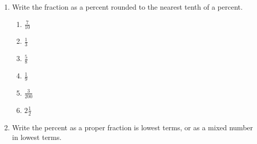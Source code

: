 \documentclass[12pt]{article}
\begin{document}
\begin{enumerate}
\begin{multicols}{2}
\begin{enumerate}
\item \hspace{0.5in} $252\%$
  \vspace{0.25in}

\item \hspace{0.5in} $91.5\%$
  \vspace{0.25in}

\item \hspace{0.5in} $99\frac{9}{10}\%$
  \vspace{0.25in}
\end{enumerate}
\end{multicols}

\item Write the fraction as a percent rounded to the nearest tenth of a percent.
\begin{multicols}{2}
\begin{enumerate}

\item \hspace{0.5in} $\frac{7}{10}$
  \vspace{0.25in}

\item \hspace{0.5in} $\frac{1}{3}$
  \vspace{0.25in}

\item \hspace{0.5in} $\frac{5}{8}$
  \vspace{0.25in}

\item \hspace{0.5in} $\frac{1}{9}$
  \vspace{0.25in}

\item \hspace{0.5in} $\frac{3}{200}$
  \vspace{0.25in}

\item \hspace{0.5in} $2\frac{1}{2}$
  \vspace{0.25in}

\end{enumerate}
\end{multicols}

\item Write the percent as a proper fraction is lowest terms, or as a mixed number in lowest terms.
\begin{multicols}{2}
\begin{enumerate}


\end{enumerate}
\end{multicols}
\end{enumerate}
\end{document}
